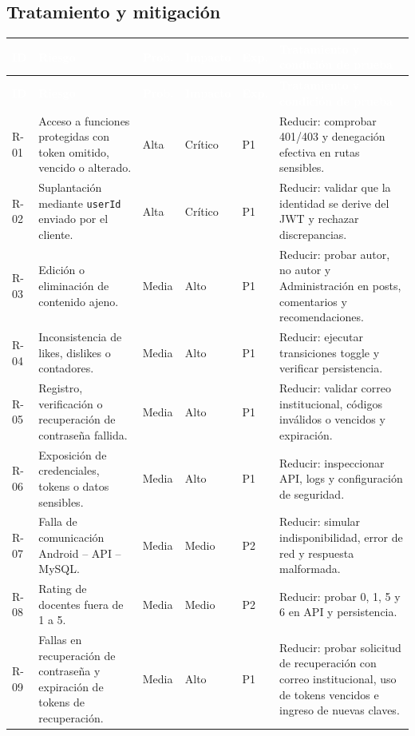 \documentclass[11pt,a4paper]{article}
\newcommand{\thead}[1]{\textcolor{white}{\textbf{#1}}}
\begin{document}
\subsection{Tratamiento y mitigación}
\footnotesize
\begin{longtable}{p{0.8cm}p{4.5cm}p{0.8cm}p{0.9cm}p{0.7cm}p{5.0cm}}
\rowcolor{uniwayblue}\thead{ID} & \thead{Riesgo} & \thead{Prob.} & \thead{Impacto} & \thead{Exp.} & \thead{Tratamiento y condición de prueba}\\
\endfirsthead
\rowcolor{uniwayblue}\thead{ID} & \thead{Riesgo} & \thead{Prob.} & \thead{Impacto} & \thead{Exp.} & \thead{Tratamiento y condición de prueba}\\
\endhead
R-01 & Acceso a funciones protegidas con token omitido, vencido o alterado. & Alta & Crítico & P1 & Reducir: comprobar 401/403 y denegación efectiva en rutas sensibles.\\
\rowcolor{lightgray}R-02 & Suplantación mediante \texttt{userId} enviado por el cliente. & Alta & Crítico & P1 & Reducir: validar que la identidad se derive del JWT y rechazar discrepancias.\\
R-03 & Edición o eliminación de contenido ajeno. & Media & Alto & P1 & Reducir: probar autor, no autor y Administración en posts, comentarios y recomendaciones.\\
\rowcolor{lightgray}R-04 & Inconsistencia de likes, dislikes o contadores. & Media & Alto & P1 & Reducir: ejecutar transiciones toggle y verificar persistencia.\\
R-05 & Registro, verificación o recuperación de contraseña fallida. & Media & Alto & P1 & Reducir: validar correo institucional, códigos inválidos o vencidos y expiración.\\
\rowcolor{lightgray}R-06 & Exposición de credenciales, tokens o datos sensibles. & Media & Alto & P1 & Reducir: inspeccionar API, logs y configuración de seguridad.\\
R-07 & Falla de comunicación Android -- API -- MySQL. & Media & Medio & P2 & Reducir: simular indisponibilidad, error de red y respuesta malformada.\\
\rowcolor{lightgray}R-08 & Rating de docentes fuera de 1 a 5. & Media & Medio & P2 & Reducir: probar 0, 1, 5 y 6 en API y persistencia.\\
R-09 & Fallas en recuperación de contraseña y expiración de tokens de recuperación. & Media & Alto & P1 & Reducir: probar solicitud de recuperación con correo institucional, uso de tokens vencidos e ingreso de nuevas claves.\\

\end{longtable}
\end{document}
